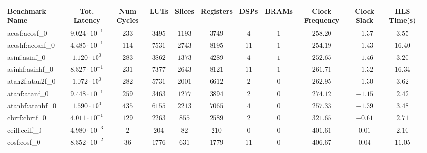 \begin{tabular}{|l|c|c|c|c|c|c|c|c|c|c|}
\hline
Benchmark Name               & Tot. Latency            & Num Cycles & LUTs       & Slices    & Registers  & DSPs    & BRAMs & Clock Frequency & Clock Slack & HLS Time(s) \\
\hline
acosf:acosf\_0               & $ 9.024 \cdot 10^{-1} $ & $ 233    $ & $ 3495   $ & $ 1193  $ & $ 3749   $ & $ 4   $ & $ 1 $ & $ 258.20      $ & $ -1.37   $ & $ 3.55    $ \\
acoshf:acoshf\_0             & $ 4.485 \cdot 10^{-1} $ & $ 114    $ & $ 7531   $ & $ 2743  $ & $ 8195   $ & $ 11  $ & $ 1 $ & $ 254.19      $ & $ -1.43   $ & $ 16.40   $ \\
asinf:asinf\_0               & $ 1.120 \cdot 10^{0}  $ & $ 283    $ & $ 3862   $ & $ 1373  $ & $ 4289   $ & $ 4   $ & $ 1 $ & $ 252.65      $ & $ -1.46   $ & $ 3.20    $ \\
asinhf:asinhf\_0             & $ 8.827 \cdot 10^{-1} $ & $ 231    $ & $ 7377   $ & $ 2643  $ & $ 8121   $ & $ 11  $ & $ 1 $ & $ 261.71      $ & $ -1.32   $ & $ 16.34   $ \\
atan2f:atan2f\_0             & $ 1.072 \cdot 10^{0}  $ & $ 282    $ & $ 5731   $ & $ 2001  $ & $ 6612   $ & $ 2   $ & $ 0 $ & $ 262.95      $ & $ -1.30   $ & $ 3.62    $ \\
atanf:atanf\_0               & $ 9.448 \cdot 10^{-1} $ & $ 259    $ & $ 3463   $ & $ 1277  $ & $ 3894   $ & $ 2   $ & $ 0 $ & $ 274.12      $ & $ -1.15   $ & $ 2.42    $ \\
atanhf:atanhf\_0             & $ 1.690 \cdot 10^{0}  $ & $ 435    $ & $ 6155   $ & $ 2213  $ & $ 7065   $ & $ 4   $ & $ 0 $ & $ 257.33      $ & $ -1.39   $ & $ 3.48    $ \\
cbrtf:cbrtf\_0               & $ 4.011 \cdot 10^{-1} $ & $ 129    $ & $ 2263   $ & $ 855   $ & $ 2589   $ & $ 2   $ & $ 0 $ & $ 321.65      $ & $ -0.61   $ & $ 2.71    $ \\
ceilf:ceilf\_0               & $ 4.980 \cdot 10^{-3} $ & $ 2      $ & $ 204    $ & $ 82    $ & $ 210    $ & $ 0   $ & $ 0 $ & $ 401.61      $ & $ 0.01    $ & $ 2.10    $ \\
cosf:cosf\_0                 & $ 8.852 \cdot 10^{-2} $ & $ 36     $ & $ 1776   $ & $ 631   $ & $ 1779   $ & $ 11  $ & $ 0 $ & $ 406.67      $ & $ 0.04    $ & $ 11.05   $ \\

\end{tabular}
